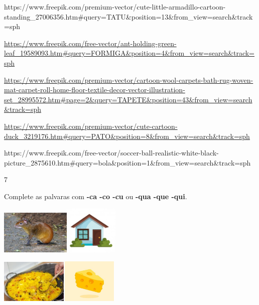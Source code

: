 {https://www.freepik.com/premium-vector/cute-little-armadillo-cartoon-standing\_27006356.htm\#query=TATU\&position=13\&from\_view=search\&track=sph

\url{https://www.freepik.com/free-vector/ant-holding-green-leaf_19589093.htm\#query=FORMIGA\&position=4\&from_view=search\&track=sph}

\url{https://www.freepik.com/premium-vector/cartoon-wool-carpets-bath-rug-woven-mat-carpet-roll-home-floor-textile-decor-vector-illustration-set_28995572.htm\#page=2\&query=TAPETE\&position=43\&from_view=search\&track=sph}

\url{https://www.freepik.com/premium-vector/cute-cartoon-duck_3219176.htm\#query=PATO\&position=8\&from_view=search\&track=sph}

https://www.freepik.com/free-vector/soccer-ball-realistic-white-black-picture\_2875610.htm\#query=bola\&position=1\&from\_view=search\&track=sph

\num{7}

Complete as palvaras com \textbf{-ca -co -cu} ou \textbf{-qua -que -qui}.


\includegraphics[width=1.30278in,height=0.81667in]{media/image26.jpeg}\includegraphics[width=1.00903in,height=0.90972in]{media/image27.jpeg}

\includegraphics[width=1.24028in,height=0.81042in]{media/image28.jpeg}\includegraphics[width=1.05556in,height=0.81667in]{media/image29.jpeg}

}
